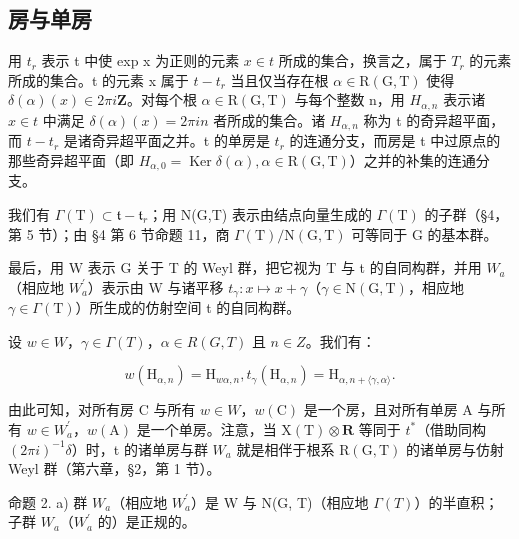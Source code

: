 \subsection{房与单房}

用 \(t_{r}\) 表示 t 中使 exp x 为正则的元素 \(x \in t\) 所成的集合，换言之，属于 \(T_{r}\) 的元素所成的集合。t 的元素 x 属于 \(t - t_{r}\) 当且仅当存在根 \(\alpha \in \mathrm{R}(\mathrm{G}, \mathrm{T})\) 使得 \(\delta(\alpha)(x) \in 2\pi i\mathbf{Z}\)。对每个根 \(\alpha \in \mathrm{R}(\mathrm{G}, \mathrm{T})\) 与每个整数 n，用 \(H_{\alpha,n}\) 表示诸 \(x \in t\) 中满足 \(\delta(\alpha)(x) = 2\pi in\) 者所成的集合。诸 \(H_{\alpha,n}\) 称为 t 的奇异超平面，而 \(t - t_{r}\) 是诸奇异超平面之并。t 的单房是 \(t_{r}\) 的连通分支，而房是 t 中过原点的那些奇异超平面（即 \(H_{\alpha,0} = \operatorname{Ker}\delta(\alpha), \alpha \in \mathrm{R}(\mathrm{G}, \mathrm{T})\)）之并的补集的连通分支。

我们有 \(\varGamma(\mathrm{T})\subset\mathfrak{t}-\mathfrak{t}_{r}\)；用 N(G,T) 表示由结点向量生成的 \(\varGamma(\mathrm{T})\) 的子群（§4，第 5 节）；由 §4 第 6 节命题 11，商 \(\varGamma(\mathrm{T})/\mathrm{N}(\mathrm{G},\mathrm{T})\) 可等同于 G 的基本群。

最后，用 W 表示 G 关于 T 的 Weyl 群，把它视为 T 与 t 的自同构群，并用 \(W_{a}\)（相应地 \(W_{a}^{\prime}\)）表示由 W 与诸平移 \(t_{\gamma}: x \mapsto x + \gamma\)（\(\gamma \in \mathrm{N}(\mathrm{G}, \mathrm{T})\)，相应地 \(\gamma \in \Gamma(\mathrm{T})\)）所生成的仿射空间 t 的自同构群。

设 \(w \in W\)，\(\gamma \in \Gamma(T)\)，\(\alpha \in R(G, T)\) 且 \(n \in Z\)。我们有：

\[
w (\mathrm{H} _ {\alpha , n}) = \mathrm{H} _ {w \alpha , n}, t _ {\gamma} (\mathrm{H} _ {\alpha , n}) = \mathrm{H} _ {\alpha , n + \langle \gamma , \alpha \rangle}.
\]

由此可知，对所有房 C 与所有 \(w \in W\)，\(w(\mathrm{C})\) 是一个房，且对所有单房 A 与所有 \(w \in W_{a}^{\prime}\)，\(w(\mathrm{A})\) 是一个单房。注意，当 \(\mathrm{X}(\mathrm{T}) \otimes \mathbf{R}\) 等同于 \(t^{*}\)（借助同构 \((2\pi i)^{-1}\delta\)）时，t 的诸单房与群 \(W_{a}\) 就是相伴于根系 \(\mathrm{R}(\mathrm{G}, \mathrm{T})\) 的诸单房与仿射 Weyl 群（第六章，§2，第 1 节）。

命题 2. a) 群 \(W_{a}\)（相应地 \(W_{a}^{\prime}\)）是 W 与 N(G, T)（相应地 \(\Gamma(T)\)）的半直积；子群 \(W_{a}\)（\(W_{a}^{\prime}\) 的）是正规的。

